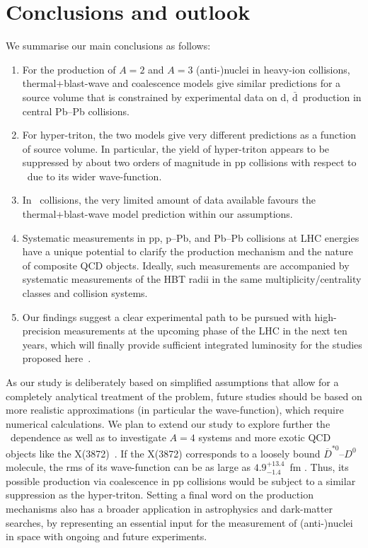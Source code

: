 \documentclass[%
 reprint,
 amsmath,amssymb,
 aps,
]{revtex4-1}
\begin{document}
\section{Conclusions and outlook}
We summarise our main conclusions as follows:
\begin{enumerate}
	\item For the production of $A=2$ and $A=3$ \mbox{(anti-)nuclei} in heavy-ion collisions, thermal+blast-wave and coalescence models give similar predictions for a source volume that is constrained by experimental data on d, $\bar{\mathrm{d}}$~production in central Pb--Pb collisions.
	\item For hyper-triton, the two models give very different predictions as a function of source volume. In particular, the yield of hyper-triton appears to be suppressed by about two orders of magnitude in pp collisions with respect to \hethree~due to its wider wave-function. 
	\item In \PbPb~collisions, the very limited amount of data available favours the thermal+blast-wave model prediction within our assumptions.
	\item Systematic measurements in pp, p--Pb, and Pb--Pb collisions at LHC energies have a unique potential to clarify the production mechanism and the nature of composite QCD objects. Ideally, such measurements are accompanied by systematic measurements of the HBT radii in the same multiplicity/centrality classes and collision systems.
	\item Our findings suggest a clear experimental path to be pursued with high-precision measurements at the upcoming phase of the LHC in the next ten years, which will finally provide sufficient integrated luminosity for the studies proposed here~\cite{Citron:2018lsq}.

\end{enumerate}
As our study is deliberately based on simplified assumptions that allow for a completely analytical treatment of the problem, future studies should be based on more realistic approximations (in particular the wave-function), which require numerical calculations. 
We plan to extend our study to explore further the \pt~dependence as well as to investigate $A=4$ systems and more exotic QCD objects like the X(3872)~\cite{Esposito:2015fsa, Cho:2017dcy}. 
If the X(3872) corresponds to a loosely bound $\overline{D}^{*0}$--$D^{0}$ molecule, the rms of its wave-function can be as large as $4.9^{+13.4}_{-1.4}$~fm \cite{Artoisenet:2010uu}. Thus, its possible production via coalescence in pp collisions would be subject to a similar suppression as the hyper-triton. 
Setting a final word on the production mechanisms also has a broader application in astrophysics and dark-matter searches, by representing an essential input for the measurement of (anti-)nuclei in space with ongoing \cite{Alcaraz:2000ss, Poulin:2018wzu} and future \cite{AMS100, Aramaki:2015laa} experiments. 
\end{document}
